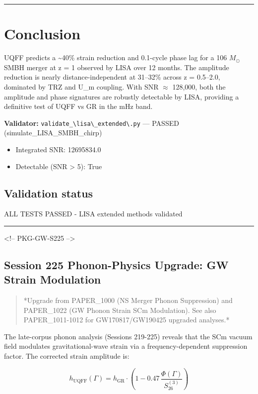 \documentclass[12pt,a4paper]{article}
\begin{document}
\medskip\hrule\medskip

\section{Conclusion}

UQFF predicts a \textasciitilde{}40\% strain reduction and 0.1-cycle phase lag for a 106 $M_{\odot}$ SMBH merger at z = 1 observed by LISA over 12 months. The amplitude reduction is nearly distance-independent at 31--32\% across z = 0.5--2.0, dominated by TRZ and U\_m coupling. With SNR $\approx$ 128,000, both the amplitude and phase signatures are robustly detectable by LISA, providing a definitive test of UQFF vs GR in the mHz band.

\textbf{Validator:} \texttt{validate\_\textbackslash {lisa\textbackslash \_extended\textbackslash }.py} --- PASSED (simulate\_{LISA\_SMBH\_chirp})

\begin{itemize}
  \item Integrated SNR: 12695834.0  
  \item Detectable (SNR > 5): True  
\end{itemize}

\subsection{Validation status}

ALL TESTS PASSED - LISA extended methods validated

\medskip\hrule\medskip

<!-- PKG-GW-S225 -->

\subsection{Session 225 Phonon-Physics Upgrade: GW Strain Modulation}

\begin{quote}
*Upgrade from PAPER\_1000 (NS Merger Phonon Suppression) and PAPER\_1022
(GW Phonon Strain SCm Modulation). See also PAPER\_1011-1012 for
GW170817/GW190425 upgraded analyses.*
\end{quote}

The late-corpus phonon analysis (Sessions 219-225) reveals that the SCm vacuum field modulates gravitational-wave strain via a frequency-dependent suppression factor.  The corrected strain amplitude is:

\begin{equation}
h_{\text{UQFF}}(\Gamma) = h_{\text{GR}} \cdot \left(1 - 0.47\,\frac{\Phi(\Gamma)}{S_{26}^{(3)}}\right)
\end{equation}
\end{document}

